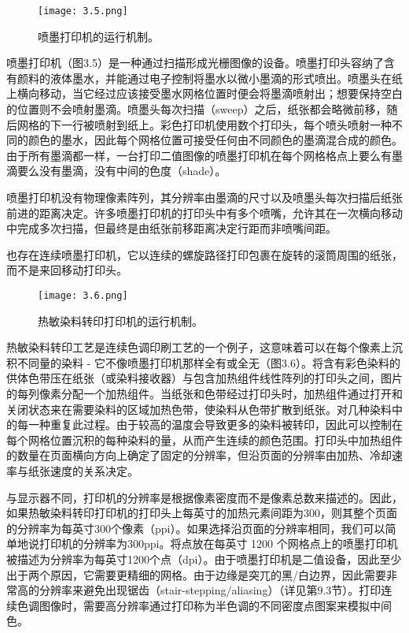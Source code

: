 \documentclass[lang=cn,12pt]{elegantbook}
\begin{document}
\begin{figure}[htb]
  \centering
  \texttt{[image: 3.5.png]}
  \caption{喷墨打印机的运行机制。}
\end{figure}

喷墨打印机（图3.5）是一种通过扫描形成光栅图像的设备。喷墨打印头容纳了含有颜料的液体墨水，并能通过电子控制将墨水以微小墨滴的形式喷出。喷墨头在纸上横向移动，当它经过应该接受墨水网格位置时便会将墨滴喷射出；想要保持空白的位置则不会喷射墨滴。喷墨头每次扫描（sweep）之后，纸张都会略微前移，随后网格的下一行被喷射到纸上。彩色打印机使用数个打印头，每个喷头喷射一种不同的颜色的墨水，因此每个网格位置可接受任何由不同颜色的墨滴混合成的颜色。由于所有墨滴都一样，一台打印二值图像的喷墨打印机在每个网格格点上要么有墨滴要么没有墨滴，没有中间的色度（shade）。

喷墨打印机没有物理像素阵列，其分辨率由墨滴的尺寸以及喷墨头每次扫描后纸张前进的距离决定。许多喷墨打印机的打印头中有多个喷嘴，允许其在一次横向移动中完成多次扫描，但最终是由纸张前移距离决定行距而非喷嘴间距。

\begin{note}
  也存在连续喷墨打印机，它以连续的螺旋路径打印包裹在旋转的滚筒周围的纸张，而不是来回移动打印头。
\end{note}

\begin{figure}[htb]
  \centering
  \texttt{[image: 3.6.png]}
  \caption{热敏染料转印打印机的运行机制。}
\end{figure}

热敏染料转印工艺是连续色调印刷工艺的一个例子，这意味着可以在每个像素上沉积不同量的染料 - 它不像喷墨打印机那样全有或全无（图3.6）。将含有彩色染料的供体色带压在纸张（或染料接收器）与包含加热组件线性阵列的打印头之间，图片的每列像素分配一个加热组件。当纸张和色带经过打印头时，加热组件通过打开和关闭状态来在需要染料的区域加热色带，使染料从色带扩散到纸张。对几种染料中的每一种重复此过程。由于较高的温度会导致更多的染料被转印，因此可以控制在每个网格位置沉积的每种染料的量，从而产生连续的颜色范围。打印头中加热组件的数量在页面横向方向上确定了固定的分辨率，但沿页面的分辨率由加热、冷却速率与纸张速度的关系决定。

与显示器不同，打印机的分辨率是根据像素密度而不是像素总数来描述的。因此，如果热敏染料转印打印机的打印头上每英寸的加热元素间距为300，则其整个页面的分辨率为每英寸300个像素（ppi）。如果选择沿页面的分辨率相同，我们可以简单地说打印机的分辨率为300ppi。将点放在每英寸 1200 个网格点上的喷墨打印机被描述为分辨率为每英寸1200个点（dpi）。由于喷墨打印机是二值设备，因此至少出于两个原因，它需要更精细的网格。由于边缘是突兀的黑/白边界，因此需要非常高的分辨率来避免出现锯齿（stair-stepping/aliasing）（详见第9.3节）。打印连续色调图像时，需要高分辨率通过打印称为半色调的不同密度点图案来模拟中间色。
\end{document}
